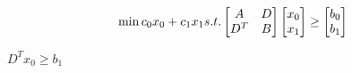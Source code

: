 \documentclass{article}
\begin{document}
\begin{equation}
\min c_0x_0+c_1x_1\\
s.t. \begin{bmatrix}
A & D \\
D^T & B
\end{bmatrix}\begin{bmatrix}
 x_0\\
x_1
\end{bmatrix}\geq \begin{bmatrix}
b_0\\
b_1
\end{bmatrix}
\end{equation}

$D^Tx_0\geq b_1$




\end{document}
